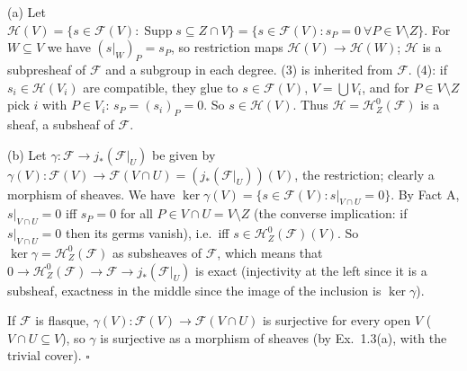 \documentclass[11pt]{article}
\begin{document}
\pf
(a) Let $\mathcal H(V)=\{s\in\mathcal F(V):\operatorname{Supp}s\subseteq Z\cap V\}=\{s\in\mathcal F(V): s_P=0\ \forall P\in V\setminus Z\}$. For $W\subseteq V$ we have $(s|_W)_P=s_P$, so restriction maps $\mathcal H(V)\to\mathcal H(W)$; $\mathcal H$ is a subpresheaf of $\mathcal F$ and a subgroup in each degree. (3) is inherited from $\mathcal F$. (4): if $s_i\in\mathcal H(V_i)$ are compatible, they glue to $s\in\mathcal F(V)$, $V=\bigcup V_i$, and for $P\in V\setminus Z$ pick $i$ with $P\in V_i$: $s_P=(s_i)_P=0$. So $s\in\mathcal H(V)$. Thus $\mathcal H=\mathcal H^0_Z(\mathcal F)$ is a sheaf, a subsheaf of $\mathcal F$.

(b) Let $\gamma\colon\mathcal F\to j_*(\mathcal F|_U)$ be given by $\gamma(V)\colon\mathcal F(V)\to\mathcal F(V\cap U)=(j_*(\mathcal F|_U))(V)$, the restriction; clearly a morphism of sheaves. We have $\ker\gamma(V)=\{s\in\mathcal F(V):s|_{V\cap U}=0\}$. By Fact A, $s|_{V\cap U}=0$ iff $s_P=0$ for all $P\in V\cap U=V\setminus Z$ (the converse implication: if $s|_{V\cap U}=0$ then its germs vanish), i.e.\ iff $s\in\mathcal H^0_Z(\mathcal F)(V)$. So $\ker\gamma=\mathcal H^0_Z(\mathcal F)$ as subsheaves of $\mathcal F$, which means that $0\to\mathcal H^0_Z(\mathcal F)\to\mathcal F\to j_*(\mathcal F|_U)$ is exact (injectivity at the left since it is a subsheaf, exactness in the middle since the image of the inclusion is $\ker\gamma$).

If $\mathcal F$ is flasque, $\gamma(V)\colon\mathcal F(V)\to\mathcal F(V\cap U)$ is surjective for every open $V$ ($V\cap U\subseteq V$), so $\gamma$ is surjective as a morphism of sheaves (by Ex.~1.3(a), with the trivial cover). \hfill$\square$
\end{document}
